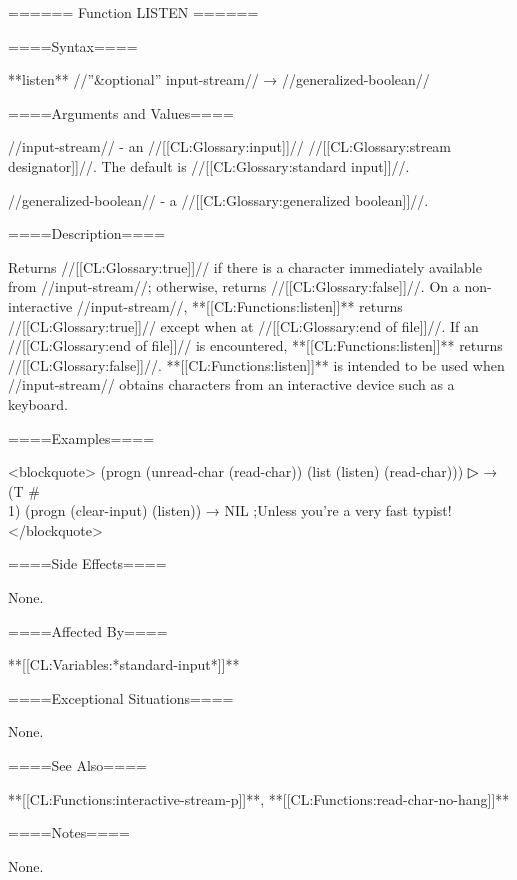 ====== Function LISTEN ======

====Syntax====

**{listen}** //''&optional'' input-stream// → //generalized-boolean//

====Arguments and Values====

//input-stream// - an //[[CL:Glossary:input]]// //[[CL:Glossary:stream designator]]//. The default is //[[CL:Glossary:standard input]]//.

//generalized-boolean// - a //[[CL:Glossary:generalized boolean]]//.

====Description====

Returns //[[CL:Glossary:true]]// if there is a character immediately available from //input-stream//; otherwise, returns //[[CL:Glossary:false]]//. On a non-interactive //input-stream//, **[[CL:Functions:listen]]** returns //[[CL:Glossary:true]]// except when at //[[CL:Glossary:end of file]]//. If an //[[CL:Glossary:end of file]]// is encountered, **[[CL:Functions:listen]]** returns //[[CL:Glossary:false]]//. **[[CL:Functions:listen]]** is intended to be used when //input-stream// obtains characters from an interactive device such as a keyboard.

====Examples====

<blockquote> (progn (unread-char (read-char)) (list (listen) (read-char)))
▷  → (T #\\1) (progn (clear-input) (listen)) → NIL ;Unless you're a very fast typist! </blockquote>

====Side Effects====

None.

====Affected By====

**[[CL:Variables:*standard-input*]]**

====Exceptional Situations====

None.

====See Also====

**[[CL:Functions:interactive-stream-p]]**, **[[CL:Functions:read-char-no-hang]]**

====Notes====

None.

